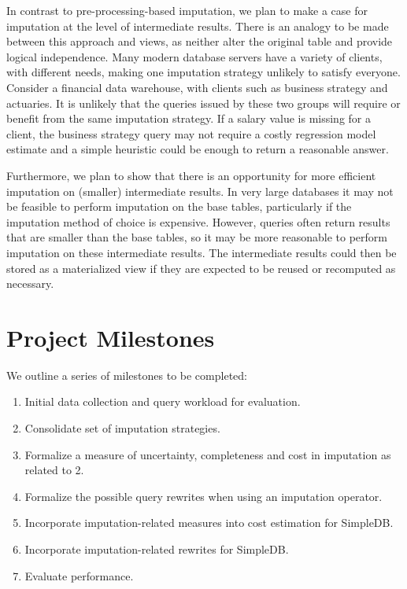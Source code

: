 \documentclass{article}
\begin{document}
In contrast to pre-processing-based imputation, we plan to make a case for imputation at the level of intermediate results. There is an analogy to be made between this approach and views, as neither alter the original table and provide logical independence. Many modern database servers have a variety of clients, with different needs, making one imputation strategy unlikely to satisfy everyone. Consider a financial data warehouse, with clients such as business strategy and actuaries. It is unlikely that the queries issued by these two groups will require or benefit from the same imputation strategy. If a salary value is missing for a client, the business strategy query may not require a costly regression model estimate and a simple heuristic could be enough to return a reasonable answer. 

Furthermore, we plan to show that there is an opportunity for more efficient imputation on (smaller) intermediate results. In very large databases it may not be feasible to perform imputation on the base tables, particularly if the imputation method of choice is expensive. However, queries often return results that are smaller than the base tables, so it may be more reasonable to perform imputation on these intermediate results. The intermediate results could then be stored as a materialized view if they are expected to be reused or recomputed as necessary.

\section{Project Milestones}

We outline a series of milestones to be completed:
\begin{enumerate}
\item Initial data collection and query workload for evaluation.
\item Consolidate set of imputation strategies.
\item Formalize a measure of uncertainty, completeness and cost in imputation as related to 2.
\item Formalize the possible query rewrites when using an imputation operator.
\item Incorporate imputation-related measures into cost estimation for SimpleDB.
\item Incorporate imputation-related rewrites for SimpleDB.
\item Evaluate performance.
\end{enumerate}
\end{document}
